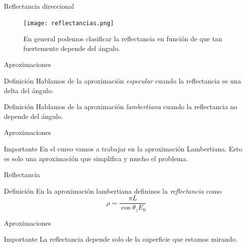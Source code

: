 \documentclass[]{beamer}
\begin{document}
\begin{frame}{Reflectancia direccional}
  \begin{figure}
    \texttt{[image: reflectancias.png]}
    \caption{En general podemos clasificar la reflectancia en función de que tan fuertemente depende del ángulo.}
  \end{figure}
\end{frame}

\begin{frame}{Aproximaciones}
  \begin{block}{Definición}
    Hablamos de la aproximación \emph{especular} cuando la reflectancia es una delta del ángulo.
  \end{block}\pause
  \begin{block}{Definición}
    Hablamos de la aproximación \emph{lambertiana} cuando la reflectancia no depende del ángulo.
  \end{block}
\end{frame}

\begin{frame}{Aproximaciones}
  \begin{alertblock}{Importante}
    En el curso vamos a trabajar en la aproximación Lambertiana. Esto es solo una aproximación que simplifica y mucho el problema.
  \end{alertblock}
\end{frame}

\begin{frame}{Reflectancia}
  \begin{block}{Definición}
    En la aproximación lambertiana defininos la \emph{reflectancia} como
    \begin{equation}
      \rho = \frac{\pi L}{\cos \theta_z E_0}
    \end{equation}
  \end{block}
\end{frame}

\begin{frame}{Aproximaciones}
  \begin{alertblock}{Importante}
    La reflectancia depende solo de la superficie que estamos mirando.
  \end{alertblock}
\end{frame}
\end{document}

